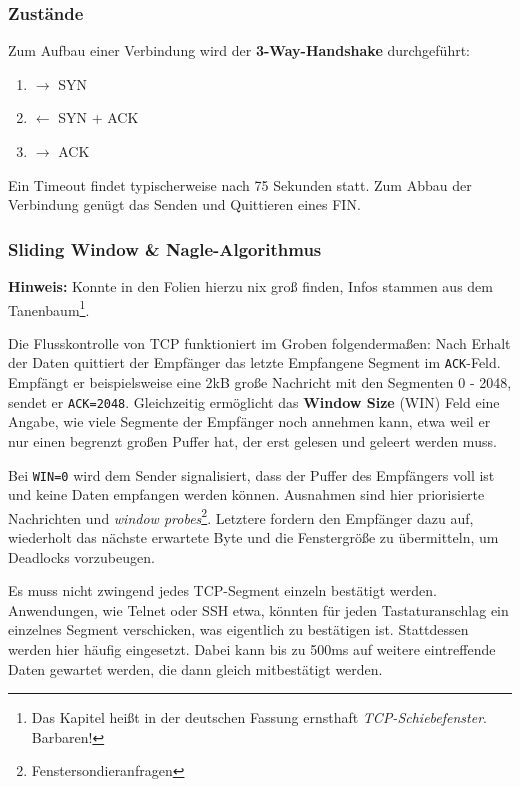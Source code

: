 \documentclass{article} %
\begin{document}
\subsubsection{Zustände}

Zum Aufbau einer Verbindung wird der \textbf{3-Way-Handshake} durchgeführt:
\begin{enumerate}
	\item $\rightarrow$ SYN
	\item $\leftarrow$ SYN + ACK
	\item $\rightarrow$ ACK
\end{enumerate}
Ein Timeout findet typischerweise nach 75 Sekunden statt. Zum Abbau der Verbindung genügt das Senden und Quittieren eines FIN.

\subsubsection{Sliding Window \& Nagle-Algorithmus}

\textbf{Hinweis:} Konnte in den Folien hierzu nix groß finden, Infos stammen aus dem Tanenbaum\footnote{Das Kapitel heißt in der deutschen Fassung ernsthaft \emph{TCP-Schiebefenster}. Barbaren!}\cite{tanenbaum2003computer}.

Die Flusskontrolle von TCP funktioniert im Groben folgendermaßen:
Nach Erhalt der Daten quittiert der Empfänger das letzte Empfangene Segment im \texttt{ACK}-Feld.
Empfängt er beispielsweise eine 2kB große Nachricht mit den Segmenten 0 - 2048, sendet er \texttt{ACK=2048}.
Gleichzeitig ermöglicht das \textbf{Window Size} (WIN) Feld eine Angabe, wie viele Segmente der Empfänger noch annehmen kann, etwa weil er nur einen begrenzt großen Puffer hat, der erst gelesen und geleert werden muss.

Bei \texttt{WIN=0} wird dem Sender signalisiert, dass der Puffer des Empfängers voll ist und keine Daten empfangen werden können.
Ausnahmen sind hier priorisierte Nachrichten und \emph{window probes}\footnote{Fenstersondieranfragen}.
Letztere fordern den Empfänger dazu auf, wiederholt das nächste erwartete Byte und die Fenstergröße zu übermitteln, um Deadlocks vorzubeugen.

Es muss nicht zwingend jedes TCP-Segment einzeln bestätigt werden.
Anwendungen, wie Telnet oder SSH etwa, könnten für jeden Tastaturanschlag ein einzelnes Segment verschicken, was eigentlich zu bestätigen ist.
Stattdessen werden hier häufig  eingesetzt.
Dabei kann bis zu 500ms auf weitere eintreffende Daten gewartet werden, die dann gleich mitbestätigt werden.
\end{document}
